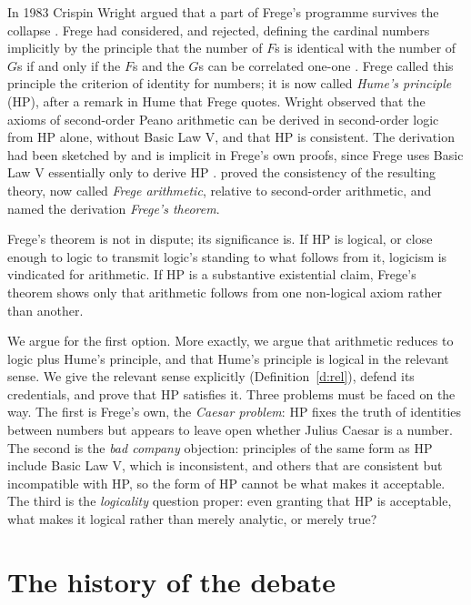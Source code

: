 \documentclass{situationist-preprint}
\begin{document}
In 1983 Crispin Wright argued that a part of Frege's programme survives the collapse \citep{Wright1983}. Frege had considered, and rejected, defining the cardinal numbers implicitly by the principle that the number of $F$s is identical with the number of $G$s if and only if the $F$s and the $G$s can be correlated one-one \citep[§§62--69]{Frege1884}. Frege called this principle the criterion of identity for numbers; it is now called \emph{Hume's principle} (HP), after a remark in Hume that Frege quotes. Wright observed that the axioms of second-order Peano arithmetic can be derived in second-order logic from HP alone, without Basic Law V, and that HP is consistent. The derivation had been sketched by \citet{Parsons1965} and is implicit in Frege's own proofs, since Frege uses Basic Law V essentially only to derive HP \citep{Heck1993}. \citet{Boolos1987} proved the consistency of the resulting theory, now called \emph{Frege arithmetic}, relative to second-order arithmetic, and named the derivation \emph{Frege's theorem}.

Frege's theorem is not in dispute; its significance is. If HP is logical, or close enough to logic to transmit logic's standing to what follows from it, logicism is vindicated for arithmetic. If HP is a substantive existential claim, Frege's theorem shows only that arithmetic follows from one non-logical axiom rather than another.

We argue for the first option. More exactly, we argue that arithmetic reduces to logic plus Hume's principle, and that Hume's principle is logical in the relevant sense. We give the relevant sense explicitly (Definition~\ref{d:rel}), defend its credentials, and prove that HP satisfies it. Three problems must be faced on the way. The first is Frege's own, the \emph{Caesar problem}: HP fixes the truth of identities between numbers but appears to leave open whether Julius Caesar is a number. The second is the \emph{bad company} objection: principles of the same form as HP include Basic Law V, which is inconsistent, and others that are consistent but incompatible with HP, so the form of HP cannot be what makes it acceptable. The third is the \emph{logicality} question proper: even granting that HP is acceptable, what makes it logical rather than merely analytic, or merely true?

\section{The history of the debate}\label{s:history}
\end{document}
